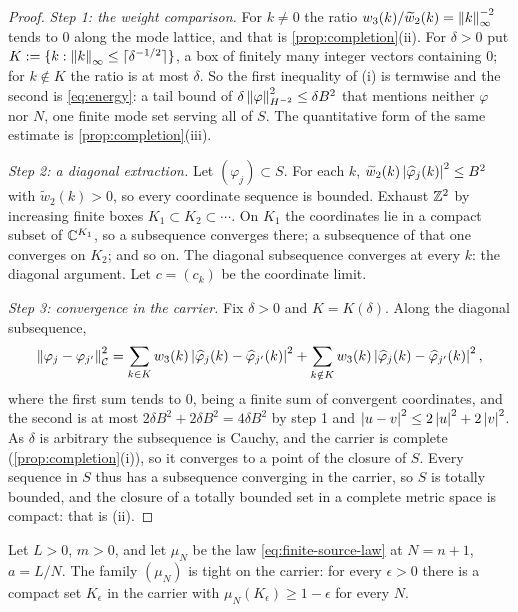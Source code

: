 \begin{proof}
\emph{Step 1: the weight comparison.} For $k\ne0$ the ratio
$w_3(k)/\widetilde w_2(k)=\left\| k \right\|_\infty^{-2}$ tends to $0$ along the mode
lattice, and that is \cref{prop:completion}(ii). For $\delta>0$ put
$K:=\{k:\left\| k \right\|_\infty\le\lceil\delta^{-1/2}\rceil\}$, a box of finitely
many integer vectors containing $0$; for $k\notin K$ the ratio is at most
$\delta$. So the first inequality of (i) is termwise and the second is
\eqref{eq:energy}: a tail bound of
$\delta\left\| \varphi \right\|^2_{H^{-2}}\le\delta B^{2}$ that mentions neither
$\varphi$ nor $N$, one finite mode set serving all of $S$. The quantitative
form of the same estimate is \cref{prop:completion}(iii).

\emph{Step 2: a diagonal extraction.} Let $(\varphi_j)\subset S$. For each
$k$, $\widetilde w_2(k)\left| \widehat\varphi_j(k) \right|^2\le B^{2}$ with
$\widetilde w_2(k)>0$, so every coordinate sequence is bounded. Exhaust
$\mathbb{Z}^2$ by increasing finite boxes $K_1\subset K_2\subset\cdots$. On $K_1$
the coordinates lie in a compact subset of $\mathbb{C}^{K_1}$, so a subsequence
converges there; a subsequence of that one converges on $K_2$; and so on.
The diagonal subsequence converges at every $k$: the diagonal argument. Let
$c=(c_k)$ be the coordinate limit.

\emph{Step 3: convergence in the carrier.} Fix $\delta>0$ and $K=K(\delta)$.
Along the diagonal subsequence,
\[
  \left\| \varphi_j-\varphi_{j'} \right\|^2_{\mathcal C}
  =\sum_{k\in K}w_3(k)\left| \widehat\varphi_j(k)-\widehat\varphi_{j'}(k) \right|^{2}
   +\sum_{k\notin K}w_3(k)\left| \widehat\varphi_j(k)-\widehat\varphi_{j'}(k) \right|^{2},
\]
where the first sum tends to $0$, being a finite sum of convergent
coordinates, and the second is at most $2\delta B^{2}+2\delta B^{2}
=4\delta B^{2}$ by step 1 and $\left| u-v \right|^{2}\le2\left| u \right|^{2}+2\left| v \right|^{2}$. As
$\delta$ is arbitrary the subsequence is Cauchy, and the carrier is complete
(\cref{prop:completion}(i)), so it converges to a point of the closure of
$S$. Every sequence in $S$ thus has a subsequence converging in the carrier,
so $S$ is totally bounded, and the closure of a totally bounded set in a
complete metric space is compact: that is (ii).
\end{proof}

\begin{theorem}[Tightness]\label{thm:tightness}
Let $L>0$, $m>0$, and let $\mu_N$ be the law \eqref{eq:finite-source-law}
at $N=n+1$, $a=L/N$. The family $(\mu_N)$ is tight on the carrier: for
every $\epsilon>0$ there is a compact set $K_\epsilon$ in the carrier with
$\mu_N(K_\epsilon)\ge1-\epsilon$ for every $N$.
\end{theorem}


